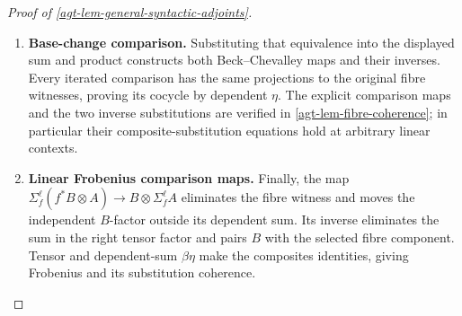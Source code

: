 \documentclass[11pt,a4paper]{article}
\numberwithin{equation}{section}
\theoremstyle{definition}
\theoremstyle{remark}
\theoremstyle{plain}
\begin{document}
\begin{proof}[Proof of \cref{agt-lem-general-syntactic-adjoints}]
\begin{enumerate}[label=\textup{(\arabic*)},leftmargin=*,itemsep=4pt,topsep=3pt]
  \item \textbf{Base-change comparison.} Substituting that equivalence into the displayed
sum and product constructs both Beck--Chevalley maps and their inverses. Every iterated comparison has the same projections to the original
fibre witnesses, proving its cocycle by dependent $\eta$.
The explicit comparison maps and the two inverse substitutions are
verified in \cref{agt-lem-fibre-coherence}; in particular their
composite-substitution equations hold at arbitrary linear contexts.
  \item \textbf{Linear Frobenius comparison maps.} Finally, the map
$\Sigma_f^\ell(f^*B\otimes A)\to B\otimes\Sigma_f^\ell A$
eliminates the fibre witness and moves the independent $B$-factor
outside its dependent sum. Its inverse eliminates the sum in the right
tensor factor and pairs $B$ with the selected fibre component. Tensor and
dependent-sum $\beta\eta$ make the composites identities, giving
Frobenius and its substitution coherence.
\end{enumerate}
\end{proof}
\end{document}
